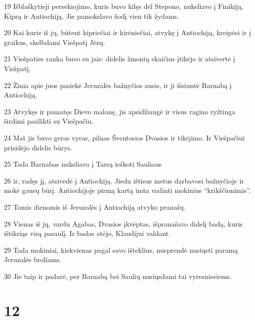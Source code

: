 \par 19 Išblaškytieji persekiojimo, kuris buvo kilęs dėl Stepono, nukeliavo į Finikiją, Kiprą ir Antiochiją. Jie pamokslavo žodį vien tik žydams. 
\par 20 Kai kurie iš jų, būtent kipriečiai ir kirėniečiai, atvykę į Antiochiją, kreipėsi ir į graikus, skelbdami Viešpatį Jėzų. 
\par 21 Viešpaties ranka buvo su jais: didelis žmonių skaičius įtikėjo ir atsivertė į Viešpatį. 
\par 22 Žinia apie juos pasiekė Jeruzalės bažnyčios ausis, ir ji išsiuntė Barnabą į Antiochiją. 
\par 23 Atvykęs ir pamatęs Dievo malonę, jis apsidžiaugė ir visus ragino ryžtinga širdimi pasilikti su Viešpačiu. 
\par 24 Mat jis buvo geras vyras, pilnas Šventosios Dvasios ir tikėjimo. Ir Viešpačiui prisidėjo didelis būrys. 
\par 25 Tada Barnabas nukeliavo į Tarsą ieškoti Sauliaus 
\par 26 ir, radęs jį, atsivedė į Antiochiją. Jiedu ištisus metus darbavosi bažnyčioje ir mokė gausų būrį. Antiochijoje pirmą kartą imta vadinti mokinius “krikščionimis”. 
\par 27 Tomis dienomis iš Jeruzalės į Antiochiją atvyko pranašų. 
\par 28 Vienas iš jų, vardu Agabas, Dvasios įkvėptas, išpranašavo didelį badą, kuris ištiksiąs visą pasaulį. Ir badas atėjo, Klaudijui valdant. 
\par 29 Tada mokiniai, kiekvienas pagal savo išteklius, nusprendė nusiųsti paramą Jeruzalės broliams. 
\par 30 Jie taip ir padarė, per Barnabą bei Saulių nusiųsdami tai vyresniesiems.


\chapter{12}


